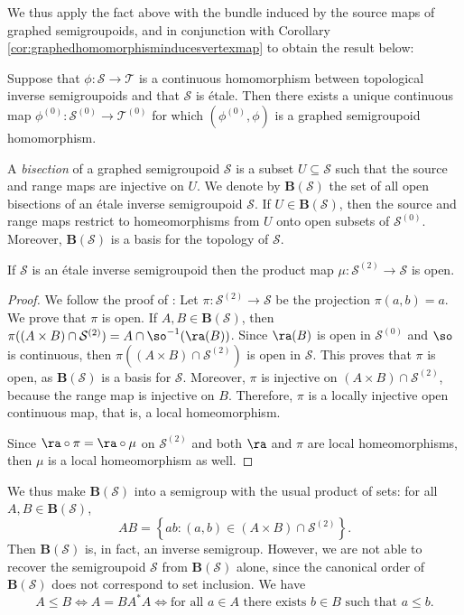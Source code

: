 We thus apply the fact above with the bundle induced by the source maps of graphed semigroupoids, and in conjunction with Corollary \ref{cor:graphedhomomorphisminducesvertexmap} to obtain the result below:

\begin{corollary}
Suppose that $\phi\colon\mathcal{S}\to\mathcal{T}$ is a continuous homomorphism between topological inverse semigroupoids and that $\mathcal{S}$ is étale. Then there exists a unique continuous map $\phi^{(0)}\colon\mathcal{S}^{(0)}\to\mathcal{T}^{(0)}$ for which $(\phi^{(0)},\phi)$ is a graphed semigroupoid homomorphism.
\end{corollary}

A \emph{bisection} of a graphed semigroupoid $\mathcal{S}$ is a subset $U\subseteq\mathcal{S}$ such that the source and range maps are injective on $U$. We denote by $\mathbf{B}(\mathcal{S})$ the set of all open bisections of an étale inverse semigroupoid $\mathcal{S}$. If $U\in\mathbf{B}(\mathcal{S})$, then the source and range maps restrict to homeomorphisms from $U$ onto open subsets of $\mathcal{S}^{(0)}$. Moreover, $\mathbf{B}(\mathcal{S})$ is a basis for the topology of $\mathcal{S}$.

\begin{proposition}\label{prop:productmapisopen}
If $\mathcal{S}$ is an étale inverse semigroupoid then the product map $\mu\colon\mathcal{S}^{(2)}\to\mathcal{S}$ is open.
\end{proposition}
\begin{proof}
We follow the proof of \cite[1.3.11]{cordeirothesis}: Let $\pi\colon \mathcal{S}^{(2)}\to\mathcal{S}$ be the projection $\pi(a,b)=a$. We prove that $\pi$ is open. If $A,B\in\mathbf{B}(\mathcal{S})$, then $\pi((A\times B)\cap \mathcal{S}^{(2)})=A\cap \so^{-1}(\ra(B))$. Since $\ra(B)$ is open in $\mathcal{S}^{(0)}$ and $\so$ is continuous, then $\pi((A\times B)\cap \mathcal{S}^{(2)})$ is open in $\mathcal{S}$. This proves that $\pi$ is open, as $\mathbf{B}(\mathcal{S})$ is a basis for $\mathcal{S}$. Moreover, $\pi$ is injective on $(A\times B)\cap\mathcal{S}^{(2)}$, because the range map is injective on $B$. Therefore, $\pi$ is a locally injective open continuous map, that is, a local homeomorphism.

Since $\ra\circ\pi=\ra\circ\mu$ on $\mathcal{S}^{(2)}$ and both $\ra$ and $\pi$ are local homeomorphisms, then $\mu$ is a local homeomorphism as well.\qedhere
\end{proof}

We thus make $\mathbf{B}(\mathcal{S})$ into a semigroup with the usual product of sets: for all $A,B\in\mathbf{B}(\mathcal{S})$,
\[AB=\left\{ab:(a,b)\in (A\times B)\cap \mathcal{S}^{(2)}\right\}.\]
Then $\mathbf{B}(\mathcal{S})$ is, in fact, an inverse semigroup. However, we are not able to recover the semigroupoid $\mathcal{S}$ from $\mathbf{B}(\mathcal{S})$ alone, since the canonical order of $\mathbf{B}(\mathcal{S})$ does not correspond to set inclusion. We have
\[A\leq B\iff A=BA^*A\iff\text{for all }a\in A\text{ there exists }b\in B\text{ such that }a\leq b.\]

